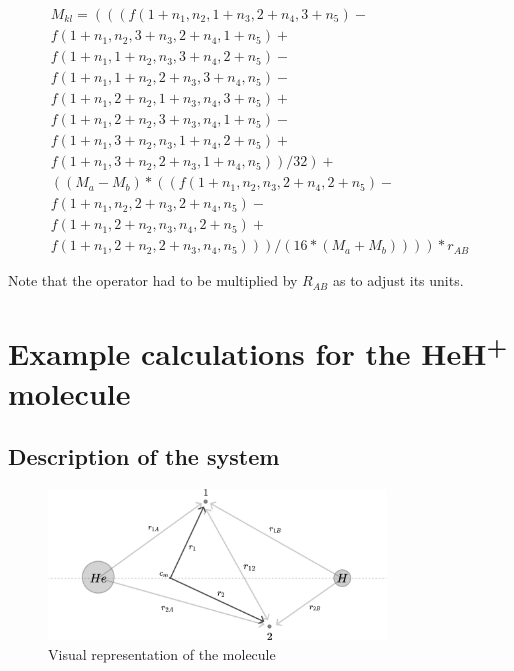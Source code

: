 \documentclass{pracalicmgr}
\begin{document}
\begin{multline}
    M_{kl} = \left(\left(\left(f\left(1 + n_1,n_2,1 + n_3,2 + n_4,3 + n_5\right)\right.\right.\right. - \\
    f\left(1 + n_1,n_2,3 + n_3,2 + n_4,1 + n_5\right) + \\
    f\left(1 + n_1,1 + n_2,n_3,3 + n_4,2 + n_5\right) - \\
    f\left(1 + n_1,1 + n_2,2 + n_3,3 + n_4,n_5\right) - \\
    f\left(1 + n_1,2 + n_2,1 + n_3,n_4,3 + n_5\right) + \\
    f\left(1 + n_1,2 + n_2,3 + n_3,n_4,1 + n_5\right) - \\
    f\left(1 + n_1,3 + n_2,n_3,1 + n_4,2 + n_5\right) + \\
    f\left(1 + n_1,3 + n_2,2 + n_3,1 + n_4,n_5\right)\left.\left.\right)/32\right) +\\
    \left(\left(M_a - M_b\right)*\left(\left(f\left(1 + n_1,n_2,n_3,2 + n_4,2 + n_5\right)\right.\right.\right. -\\ 
    f\left(1 + n_1,n_2,2 + n_3,2 + n_4,n_5\right) - \\
    f\left(1 + n_1,2 + n_2,n_3,n_4,2 + n_5\right) + \\
    \left.\left.\left.\left.f\left(1 + n_1,2 + n_2,2 + n_3,n_4,n_5\right)\right)\right)/\left(16*\left(M_a + M_b\right)\right)\right)\right)*r_{AB}
    \label{MFform}
\end{multline}

Note that the operator had to be multiplied by $R_{AB}$ as to adjust its units.

\chapter{Example calculations for the  \texorpdfstring{HeH\textsuperscript{+}}{TEXT}  molecule}

\section{Description of the system}

\begin{figure}[H]
    \center
    \includegraphics[width=0.8\textwidth]{heh+.pdf}
    \caption{Visual representation of the molecule }
    \label{hehp}
\end{figure}
\end{document}
